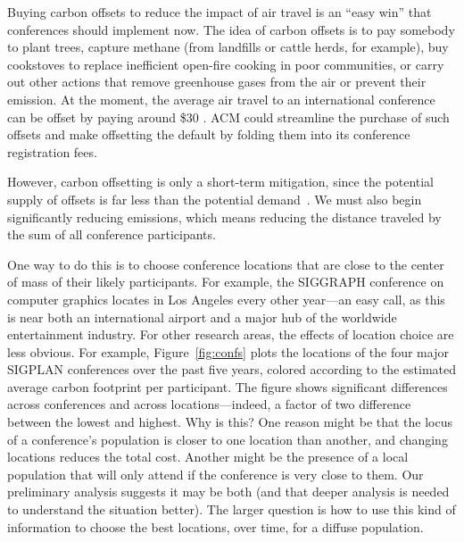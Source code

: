 \documentclass[12pt]{article}
\begin{document}
Buying carbon offsets to reduce the impact of air travel
\cite{CarbonOFfsetReport} is an ``easy win'' that conferences should
implement now.  The idea of carbon offsets is to pay somebody to plant
trees, capture methane (from landfills or cattle herds, for example), buy
cookstoves to replace inefficient open-fire cooking in poor communities, or
carry out other actions that remove greenhouse gases from the air or prevent
their emission. At the moment, the average air travel to an international
conference can be offset by paying around \$30 \cite{CarbonOFfsetReport}.
ACM could streamline the purchase of such offsets and make offsetting the
default by folding them into its conference registration fees.

However, carbon offsetting is only a short-term mitigation, since the
potential supply of offsets is far less than the potential
demand~\cite{SEI-Report}. We must also begin significantly reducing
emissions, which means reducing the distance traveled by the sum of all
conference participants.

One way to do this is to choose conference locations that are close to
the center of mass of their likely participants.  For example, the
SIGGRAPH conference on computer graphics
locates in Los Angeles every other
year---an easy call, as this is near both an international airport and a major hub
of the worldwide entertainment industry. For other research areas, the
effects of location choice are less obvious. For example,
Figure~\ref{fig:confs} plots the
locations of the four major SIGPLAN conferences over the past five years,
colored according to the estimated average carbon footprint per
participant. The figure shows significant differences across
conferences and across locations---indeed, a factor of two difference
between the
lowest and highest. Why is this? One reason might be that the locus of a
conference's population is closer to one location than another, and changing
locations reduces the total cost. Another might be the presence of a local
population that will only attend if the conference is very close to
them. Our preliminary analysis suggests it may be both (and that deeper
analysis is needed to understand the situation better). The larger question
is how to use this kind of information to choose the best locations, over
time, for a diffuse population.
\end{document}
